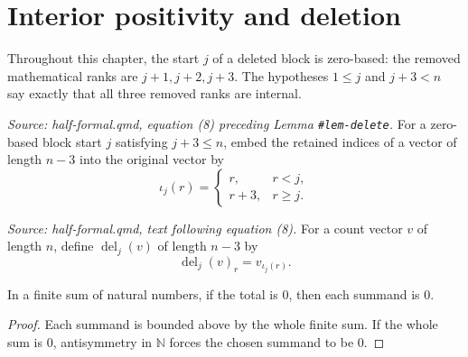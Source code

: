 \chapter{Interior positivity and deletion}

Throughout this chapter, the start \(j\) of a deleted block is zero-based:
the removed mathematical ranks are \(j+1,j+2,j+3\).  The hypotheses
\(1\leq j\) and \(j+3<n\) say exactly that all three removed ranks are
internal.

\begin{definition}
  \label{def:delete_index}
  \textit{Source: half-formal.qmd, equation (8) preceding Lemma
  \texttt{\#lem-delete}.}
  For a zero-based block start \(j\) satisfying \(j+3\leq n\), embed the
  retained indices of a vector of length \(n-3\) into the original vector
  by
  \[
    \iota_j(r)=
    \begin{cases}
      r,&r<j,\\
      r+3,&r\geq j.
    \end{cases}
  \]
\end{definition}

\begin{definition}
  \label{def:delete_three}
  \textit{Source: half-formal.qmd, text following equation (8).}
  For a count vector \(v\) of length \(n\), define
  \(\operatorname{del}_j(v)\) of length \(n-3\) by
  \[
    \operatorname{del}_j(v)_r=v_{\iota_j(r)}.
  \]
\end{definition}

\begin{lemma}

  \label{lem:red_eq_zero_of_sum_eq_zero}
  In a finite sum of natural numbers, if the total is \(0\), then each
  summand is \(0\).
\end{lemma}
\begin{proof}

\leanok
  Each summand is bounded above by the whole finite sum.  If the whole
  sum is \(0\), antisymmetry in \(\mathbb N\) forces the chosen summand
  to be \(0\).
\end{proof}

